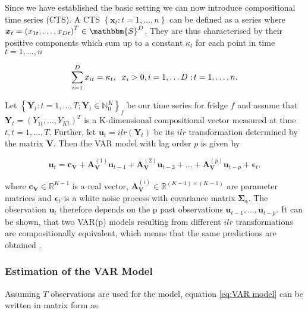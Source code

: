 Since we have established the basic setting we can now introduce compositional time series (CTS). A CTS $\left\{\bm{x}_t:t=1,\ldots,n \right\}$ can be defined as a series where $\bm{x}_t = \left(x_{1t},\ldots,x_{Dt}\right)^T \in \mathbbm{S}^D$. They are thus characterised by their positive components which sum up to a constant $\kappa_t$ for each point in time $t=1,\ldots,n$ 

\begin{equation}
\sum_{i=1}^D x_{it} = \kappa_t, \hspace{0.2cm} x_i > 0, i=1,\ldots D \hspace{0.1cm}; t=1,\ldots, n. 
\label{eq:CTS characterisation}
\end{equation} 

Let $\left\{\bm{Y}_t:t=1,\ldots,T; \bm{Y}_t \in \mathbb{N}_0^K \right\}_f$ be our time series for fridge $f$ and assume that $\bm{Y}_t=(Y_{1t},\ldots,Y_{Kt})^T$ is a K-dimensional compositional vector measured at time $t, t=1,\ldots,T$. Further, let $\textbf{u}_t = ilr(\bm{Y}_t)$ be its $ilr$ transformation determined by the matrix $\textbf{V}$. Then the VAR model with lag order $p$ is given by \cite{Kynclova:2015}

\begin{equation}
\textbf{u}_t = \textbf{c}_{\textbf{V}} + \textbf{A}_{\textbf{V}}^{(1)}\textbf{u}_{t-1} + \textbf{A}_{\textbf{V}}^{(2)}\textbf{u}_{t-2} + \ldots + \textbf{A}_{\textbf{V}}^{(p)}\textbf{u}_{t-p} + \bm{\epsilon}_{t}.
\label{eq:VAR model}
\end{equation}

where $\textbf{c}_{\textbf{V}} \in \mathbb{R}^{K-1}$ is a real vector, $\textbf{A}_{\textbf{V}}^{(i)} \in \mathbb{R}^{(K-1) \times (K-1)}$ are parameter matrices and $\bm{\epsilon}_t$ is a white noise process with covariance matrix $\bm{\Sigma_\epsilon}$. The observation $\textbf{u}_t$ therefore depends on the p past observations $\textbf{u}_{t-1},\ldots,\textbf{u}_{t-p}$. It can be shown, that two VAR(p) models resulting from different $ilr$ transformations are compositionally equivalent, which means that the same predictions are obtained \cite{Kynclova:2015}. 


\subsubsection{Estimation of the VAR Model}
\label{sec: Estimation of the Var Model}


Assuming $T$ observations are used for the model, equation \ref{eq:VAR model} can be written in matrix form as

